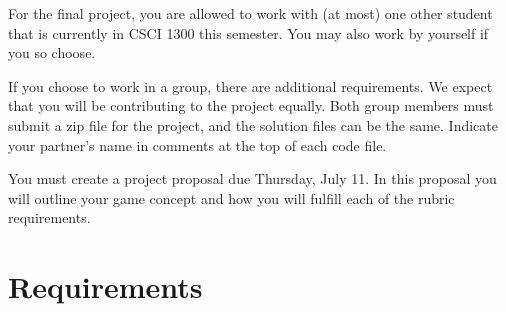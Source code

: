 For the final project, you are allowed to work with (at most) one other student that is currently in CSCI 1300 this semester. You may also work by yourself if you so choose.

If you choose to work in a group, there are additional requirements. We expect that you will be contributing to the project equally. Both group members must submit a zip file for the project, and the solution files can be the same. Indicate your partner’s name in comments at the top of each code file.

You must create a project proposal due Thursday, July 11. In this proposal you will outline your game concept and how you will fulfill each of the rubric requirements. 

\section{Requirements}
